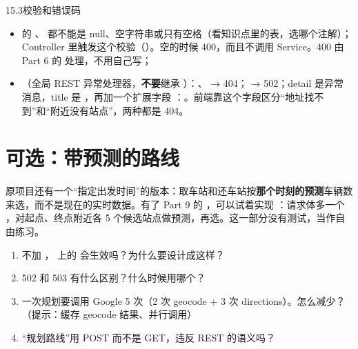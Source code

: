 \begin{task}{15.3\quad 校验和错误码}
\begin{itemize}
  \item {} 的 、 都不能是 null、空字符串或只有空格（看知识点里的表，选哪个注解）；Controller 里触发这个校验（）。空的时候 400，而且不调用 Service。400 由 Part 6 的  处理，不用自己写；
  \item {}（全局 REST 异常处理器，\textbf{不要}继承 ）：、 → 404； → 502；detail 是异常消息，title 是 ，再加一个扩展字段 ：。前端靠这个字段区分“地址找不到”和“附近没有站点”，两种都是 404。
\end{itemize}
\end{task}

\section{可选：带预测的路线}

原项目还有一个“指定出发时间”的版本：取车站和还车站按\textbf{那个时刻的预测}车辆数来选，而不是现在的实时数据。有了 Part 9 的 ，可以试着实现 ：请求体多一个 ，对起点、终点附近各 5 个候选站点做预测，再选。这一部分没有测试，当作自由练习。

\begin{think}
\begin{enumerate}
  \item 不加 ， 上的  会生效吗？为什么要设计成这样？
  \item 502 和 503 有什么区别？什么时候用哪个？
  \item 一次规划要调用 Google 5 次（2 次 geocode + 3 次 directions）。怎么减少？（提示：缓存 geocode 结果、并行调用）
  \item “规划路线”用 POST 而不是 GET，违反 REST 的语义吗？
\end{enumerate}
\end{think}
